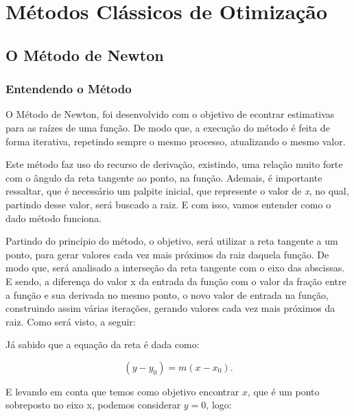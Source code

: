 

\chapter{\Large{Métodos Clássicos de Otimização}}\label{chp:2}


\section{{O Método de Newton}}


\subsection{Entendendo o Método}


\hspace{0.8cm}
O Método de Newton, foi desenvolvido com o objetivo de econtrar estimativas
para as raízes de uma função. De modo que, a execução do método é feita de
forma iterativa, repetindo sempre o mesmo processo, atualizando o mesmo valor.

Este método faz uso do recurso de derivação, existindo, uma relação muito
forte com o ângulo da reta tangente ao ponto, na função. Ademais, é
importante ressaltar, que é necessário um palpite inicial, que represente
o valor de \textit{x}, no qual, partindo desse valor, será buscado a raiz.
E com isso, vamos entender como o dado método funciona.

Partindo do princípio do método, o objetivo, será utilizar a reta tangente a um
ponto, para gerar valores cada vez mais próximos da raiz daquela função. De
modo que, será analisado a interseção da reta tangente com o eixo das
abscissas. E sendo, a diferença do valor x da entrada da função com o valor da
fração entre a função e sua derivada no mesmo ponto, o novo valor de entrada na
função, construindo assim várias iterações, gerando valores cada vez mais
próximos da raiz. Como será visto, a seguir:

Já sabido que a equação da reta é dada como:

\begin{equation}
    (y - y_0) = m(x - x_0).
\end{equation}

E levando em conta que temos como objetivo encontrar $x$, que é um ponto
sobreposto no eixo x, podemos considerar $y=0$, logo:

